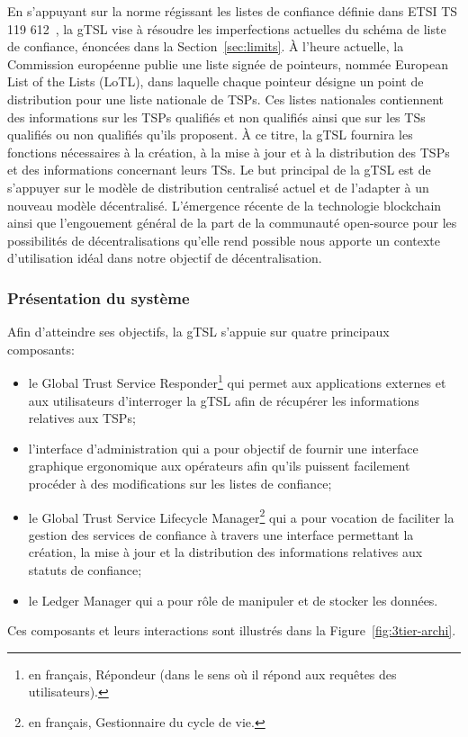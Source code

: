 \documentclass{tnreport}
\begin{document}
En s'appuyant sur la norme régissant les listes de confiance définie dans ETSI TS 119 612~\cite{ETSITS119612}, la gTSL vise à résoudre les imperfections actuelles du schéma de liste de confiance, énoncées dans la Section~\ref{sec:limits}. 
À l'heure actuelle, la Commission européenne publie une liste signée de pointeurs, nommée European List of the Lists (LoTL), dans laquelle chaque pointeur désigne un point de distribution pour une liste nationale de TSPs. 
Ces listes nationales contiennent des informations sur les TSPs qualifiés et non qualifiés ainsi que sur les TSs qualifiés ou non qualifiés qu'ils proposent.
À ce titre, la gTSL fournira les fonctions nécessaires à la création, à la mise à jour et à la distribution des TSPs et des informations concernant leurs TSs.
Le but principal de la gTSL est de s'appuyer sur le modèle de distribution centralisé actuel et de l'adapter à un nouveau modèle décentralisé.
L'émergence récente de la technologie blockchain ainsi que l'engouement général de la part de  la communauté open-source pour les possibilités de décentralisations qu'elle rend possible nous apporte un contexte d'utilisation idéal dans notre objectif de décentralisation.

\subsubsection{Présentation du système}

Afin d'atteindre ses objectifs, la gTSL s'appuie sur quatre principaux composants:
\begin{itemize}	
	\item le Global Trust Service Responder\footnote{en français, Répondeur (dans le sens où il répond aux requêtes des utilisateurs).} qui permet aux applications externes et aux utilisateurs d'interroger la gTSL afin de récupérer les informations relatives aux TSPs;
	\item l'interface d'administration qui a pour objectif de fournir une interface graphique ergonomique aux opérateurs afin qu'ils puissent facilement procéder à des modifications sur les listes de confiance;
	\item le Global Trust Service Lifecycle Manager\footnote{en français, Gestionnaire du cycle de vie.} qui a pour vocation de faciliter la gestion des services de confiance à travers une interface permettant la création, la mise à jour et la distribution des informations relatives aux statuts de confiance;
	\item le Ledger Manager qui a pour rôle de manipuler et de stocker les données.
\end{itemize}
Ces composants et leurs interactions sont illustrés dans la Figure~\ref{fig:3tier-archi}.
\end{document}
